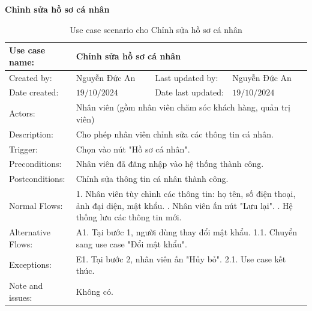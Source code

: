 \textbf{Chỉnh sửa hồ sơ cá nhân}
\begin{table}[H]
	\centering
	\begin{tabular}{|l|l|l|l|} 
		\hline Use case name: & \multicolumn{3}{|l|}{Chỉnh sửa hồ sơ cá nhân} \\ 
		\hline Created by: & Nguyễn Đức An & Last updated by: & Nguyễn Đức An \\ 
		\hline Date created: & $19 / 10 / 2024$ & Date last updated: & $19 / 10 / 2024$\\ 
		\hline Actors: & \multicolumn{3}{|p{12cm}|}{Nhân viên (gồm nhân viên chăm sóc khách hàng, quản trị viên)} \\ 
		\hline Description: & \multicolumn{3}{|p{12cm}|}{ Cho phép nhân viên chỉnh sửa các thông tin cá nhân. } \\ 
		\hline Trigger: & \multicolumn{3}{|p{12cm}|}{ Chọn vào nút "Hồ sơ cá nhân". } \\ 
		\hline Preconditions: & \multicolumn{3}{|p{12cm}|}{ Nhân viên đã đăng nhập vào hệ thống thành công. } \\ 
		\hline Postconditions: & \multicolumn{3}{|p{12cm}|}{ Chỉnh sửa thông tin cá nhân thành công. } \\ 
		\hline Normal Flows: & \multicolumn{3}{|p{12cm}|}{ 
			1. Nhân viên tùy chỉnh các thông tin: họ tên, số điện thoại, ảnh đại diện, mật khẩu. \newline 
			2. Nhân viên ấn nút "Lưu lại". \newline 
			3. Hệ thống lưu các thông tin mới. 
		} \\ 
		\hline Alternative Flows: & \multicolumn{3}{|p{12cm}|}{ 
			A1. Tại bước 1, người dùng thay đổi mật khẩu. \newline 
			\hspace{0.5cm}1.1. Chuyển sang use case "Đổi mật khẩu". 
		} \\ 
		\hline Exceptions: & \multicolumn{3}{|p{12cm}|}{ 
			E1. Tại bước 2, nhân viên ấn "Hủy bỏ". \newline 
			\hspace{0.5cm}2.1. Use case kết thúc. 
		} \\ 
		\hline Note and issues: & \multicolumn{3}{|p{12cm}|}{ Không có. } \\ 
		\hline
	\end{tabular}
	\caption{Use case scenario cho Chỉnh sửa hồ sơ cá nhân}
\end{table}


